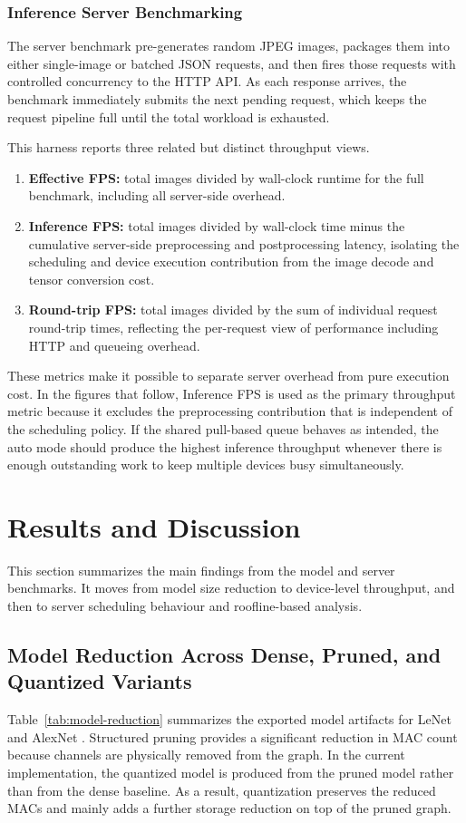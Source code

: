 \documentclass[conference]{IEEEtran}
\begin{document}
\subsubsection{Inference Server Benchmarking}
The server benchmark pre-generates random JPEG images, packages them into either single-image or batched JSON requests, and then fires those requests with controlled concurrency to the HTTP API. As each response arrives, the benchmark immediately submits the next pending request, which keeps the request pipeline full until the total workload is exhausted.

This harness reports three related but distinct throughput views.
\begin{enumerate}
\item \textbf{Effective FPS:} total images divided by wall-clock runtime for the full benchmark, including all server-side overhead.
\item \textbf{Inference FPS:} total images divided by wall-clock time minus the cumulative server-side preprocessing and postprocessing latency, isolating the scheduling and device execution contribution from the image decode and tensor conversion cost.
\item \textbf{Round-trip FPS:} total images divided by the sum of individual request round-trip times, reflecting the per-request view of performance including HTTP and queueing overhead.
\end{enumerate}

These metrics make it possible to separate server overhead from pure execution cost. In the figures that follow, Inference FPS is used as the primary throughput metric because it excludes the preprocessing contribution that is independent of the scheduling policy. If the shared pull-based queue behaves as intended, the auto mode should produce the highest inference throughput whenever there is enough outstanding work to keep multiple devices busy simultaneously.

\section{Results and Discussion}
This section summarizes the main findings from the model and server benchmarks. It moves from model size reduction to device-level throughput, and then to server scheduling behaviour and roofline-based analysis.

\subsection{Model Reduction Across Dense, Pruned, and Quantized Variants}
Table~\ref{tab:model-reduction} summarizes the exported model artifacts for LeNet and AlexNet \cite{lecun1998gradient,krizhevsky2012imagenet}. Structured pruning provides a significant reduction in MAC count because channels are physically removed from the graph. In the current implementation, the quantized model is produced from the pruned model rather than from the dense baseline. As a result, quantization preserves the reduced MACs and mainly adds a further storage reduction on top of the pruned graph.
\end{document}
